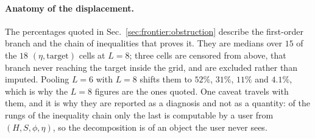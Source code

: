 \paragraph{Anatomy of the displacement.} The percentages quoted in
Sec.~\ref{sec:frontier:obstruction} describe the first-order branch and the chain of inequalities that proves
it. They are medians over $15$ of the $18$ $(\eta,\text{target})$ cells at
$L=8$; three cells are censored from above, that branch never reaching the target inside the grid,
and are excluded rather than imputed. Pooling $L=6$ with $L=8$ shifts them to $52\%$, $31\%$, $11\%$
and $4.1\%$, which is why the $L=8$ figures are the ones quoted. One caveat travels with them, and it
is why they are reported as a diagnosis and not as a quantity: of the rungs of the inequality chain
only the last is computable by a user from $(H,S,\phi,\eta)$, so the decomposition is of an object the
user never sees.
